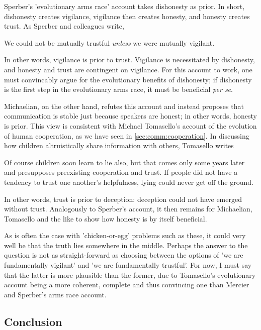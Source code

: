 Sperber's 'evolutionary arms race' account takes dishonesty as prior.
In short, dishonesty creates vigilance, vigilance then creates honesty, and honesty creates trust. As Sperber and colleagues write,
\begin{quoting}
    We could not be mutually trustful \emph{unless} we were mutually vigilant.
    \hfill \citep[p.~364]{Sperber10}
\end{quoting}
In other words, vigilance is prior to trust. Vigilance is necessitated by dishonesty, and honesty and trust are contingent on vigilance.
For this account to work, one must convincably argue for the evolutionary benefits of dishonesty; if dishonesty is the first step in the evolutionary arms race, it must be beneficial \emph{per se}.

Michaelian, on the other hand, refutes this account and instead proposes that communication is stable just because speakers are honest; in other words, honesty is prior. This view is consistent with Michael Tomasello's account of the evolution of human cooperation, as we have seen in \cref{sec:comm:cooperation}. In discussing how children altruistically share information with others, Tomasello writes
\begin{quoting}
    Of course children soon learn to lie also, but that comes only some years later and presupposes preexisting cooperation and trust. If people did not have a tendency to trust one another’s helpfulness, lying could never get off the ground.
    \hfill \citep[p.~21]{Tomasello09}
\end{quoting}
In other words, trust is prior to deception: deception could not have emerged without trust.
Analogously to Sperber's account, it then remains for Michaelian, Tomasello and the like to show how honesty is by itself beneficial.

As is often the case with 'chicken-or-egg' problems such as these, it could very well be that the truth lies somewhere in the middle. Perhaps the answer to the question is not as straight-forward as choosing between the options of 'we are fundamentally vigilant' and 'we are fundamentally trustful'. For now, I must say that the latter is more plausible than the former, due to Tomasello's evolutionary account being a more coherent, complete and thus convincing one than Mercier and Sperber's arms race account.

\subsection{Conclusion}

